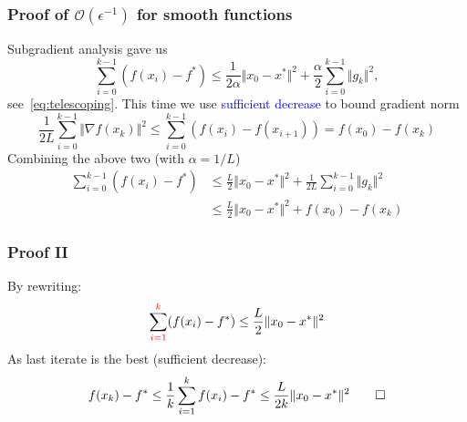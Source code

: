 \documentclass{beamer}
\begin{document}
\begin{frame}
  \frametitle{Proof of $\mathcal{O}(\epsilon^{-1})$ for smooth functions}
    Subgradient analysis gave us
    \begin{equation}
      \sum_{i=0}^{k-1} (f(x_i) - f^*) \le \frac{1}{2 \alpha}\Vert x_0-x^* \Vert^2 +  \frac{\alpha}{2} \sum_{i=0}^{k-1}  \Vert g_k \Vert^2,
    \end{equation}
    see~\eqref{eq:telescoping}. This time we use \textcolor{blue}{sufficient decrease} to bound gradient norm
    \begin{equation}
      \frac{1}{2 L} \sum_{i=0}^{k-1} \Vert \nabla f(x_k) \Vert^2 \le \sum_{i=0}^{k-1} (f(x_i) - f(x_{i+1})) = f(x_0) - f(x_k)
    \end{equation}
    Combining the above two (with $\alpha=1/L$)
    \begin{equation}
      \begin{aligned}
        \sum_{i=0}^{k-1} (f(x_i) - f^*)  &\le \frac{L}{2} \Vert x_0-x^* \Vert^2 +  \frac{1}{2L} \sum_{i=0}^{k-1}  \Vert g_k \Vert^2 \\
        &\le \frac{L}{2} \Vert x_0-x^* \Vert^2 + f(x_0) - f(x_k)
      \end{aligned}
    \end{equation}
\end{frame}

\begin{frame}
  \frametitle{Proof II}
  By rewriting:
    \begin{equation}
      \sum_{\textcolor{red}{i=1}}^{\textcolor{red}{k}} (f(x_i) - f^*) \le \frac{L}{2} \Vert x_0-x^* \Vert^2
    \end{equation}
    As last iterate is the best (sufficient decrease):
    \begin{equation}
      f(x_k) - f^* \le \frac{1}{k} \sum_{i=1}^{k} f(x_i) - f^* \le \frac{L}{2 k} \Vert x_0 - x^* \Vert^2 \qed
    \end{equation}
\end{frame}
\end{document}
